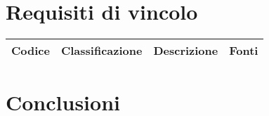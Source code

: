 \section{Requisiti di vincolo}

\begin{center}
    \begin{xltabular}{\linewidth}{|l|l|X|l|}
    \hline
    \textbf{Codice} & \textbf{Classificazione} & \textbf{Descrizione} & \textbf{Fonti} \\
    \hline

    \end{xltabular}
    \end{center}

\section{Conclusioni}